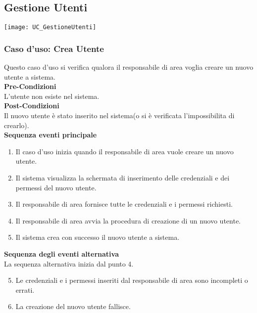\documentclass[green, fancy, 11pt]{elegantbook}
\begin{document}
\subsection{Gestione Utenti}
\texttt{[image: UC\_GestioneUtenti]}

\subsubsection{Caso d'uso: Crea Utente}
\noindent
Questo caso d’uso si verifica qualora il responsabile di area voglia creare un nuovo utente a sistema.\\
\textbf{Pre-Condizioni}\\
L’utente non esiste nel sistema.\\
\textbf{Post-Condizioni}\\
Il nuovo utente è stato inserito nel sistema(o si è verificata l’impossibilita di crearlo).\\
\textbf{Sequenza eventi principale}\\
\begin{enumerate}
	\item Il caso d’uso inizia quando il responsabile di area vuole creare un nuovo utente.
	\item Il sistema visualizza la schermata di inserimento delle credenziali e dei permessi del nuovo utente.
	\item Il responsabile di area fornisce tutte le credenziali e i permessi richiesti.
	\item Il responsabile di area avvia la procedura di creazione di un nuovo utente.
	\item Il sistema crea con successo il nuovo utente a sistema.
\end{enumerate}
\textbf{Sequenza degli eventi alternativa}\\
La sequenza alternativa inizia dal punto 4.
\begin{enumerate}
	\setcounter{enumi}{4}
	\item Le credenziali e i permessi inseriti dal responsabile di area sono incompleti o errati.
	\item La creazione del nuovo utente fallisce.
\end{enumerate}
\newpage
\end{document}
